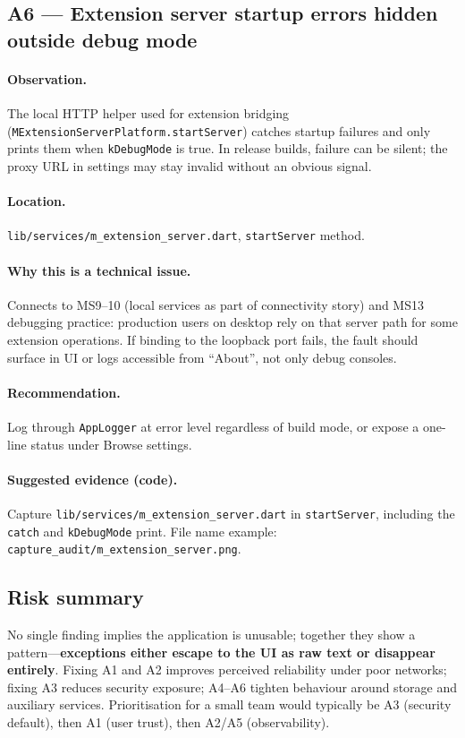 \subsection*{A6 --- Extension server startup errors hidden outside debug mode}
\paragraph{Observation.}
The local HTTP helper used for extension bridging (\texttt{MExtensionServerPlatform.startServer}) catches startup failures and only prints them when \texttt{kDebugMode} is true. In release builds, failure can be silent; the proxy URL in settings may stay invalid without an obvious signal.

\paragraph{Location.}
\texttt{lib/services/m\_extension\_server.dart}, \texttt{startServer} method.

\paragraph{Why this is a technical issue.}
Connects to MS9--10 (local services as part of connectivity story) and MS13 debugging practice: production users on desktop rely on that server path for some extension operations. If binding to the loopback port fails, the fault should surface in UI or logs accessible from ``About'', not only debug consoles.

\paragraph{Recommendation.}
Log through \texttt{AppLogger} at error level regardless of build mode, or expose a one-line status under Browse settings.

\paragraph{Suggested evidence (code).}
Capture \texttt{lib/services/m\_extension\_server.dart} in \texttt{startServer}, including the \texttt{catch} and \texttt{kDebugMode} print. File name example: \texttt{capture\_audit/m\_extension\_server.png}.

\subsection*{Risk summary}
No single finding implies the application is unusable; together they show a pattern---\textbf{exceptions either escape to the UI as raw text or disappear entirely}. Fixing A1 and A2 improves perceived reliability under poor networks; fixing A3 reduces security exposure; A4--A6 tighten behaviour around storage and auxiliary services. Prioritisation for a small team would typically be A3 (security default), then A1 (user trust), then A2/A5 (observability).
